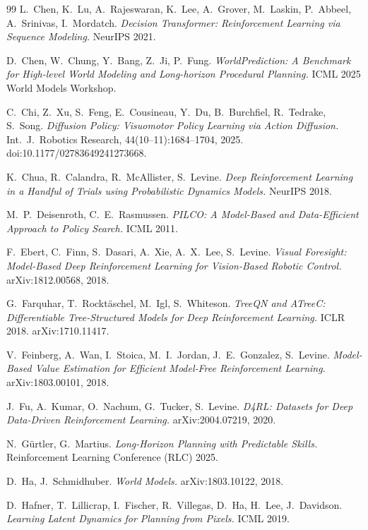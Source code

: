 \documentclass{article}
\begin{document}
\begin{thebibliography}{99}
L.~Chen, K.~Lu, A.~Rajeswaran, K.~Lee, A.~Grover, M.~Laskin, P.~Abbeel, A.~Srinivas, I.~Mordatch.
\emph{Decision Transformer: Reinforcement Learning via Sequence Modeling.}
NeurIPS 2021.

D.~Chen, W.~Chung, Y.~Bang, Z.~Ji, P.~Fung.
\emph{WorldPrediction: A Benchmark for High-level World Modeling and Long-horizon Procedural Planning.}
ICML 2025 World Models Workshop.

C.~Chi, Z.~Xu, S.~Feng, E.~Cousineau, Y.~Du, B.~Burchfiel, R.~Tedrake, S.~Song.
\emph{Diffusion Policy: Visuomotor Policy Learning via Action Diffusion.}
Int.\ J.\ Robotics Research, 44(10--11):1684--1704, 2025. doi:10.1177/02783649241273668.

K.~Chua, R.~Calandra, R.~McAllister, S.~Levine.
\emph{Deep Reinforcement Learning in a Handful of Trials using Probabilistic Dynamics Models.}
NeurIPS 2018.

M.~P.~Deisenroth, C.~E.~Rasmussen.
\emph{PILCO: A Model-Based and Data-Efficient Approach to Policy Search.}
ICML 2011.

F.~Ebert, C.~Finn, S.~Dasari, A.~Xie, A.~X.~Lee, S.~Levine.
\emph{Visual Foresight: Model-Based Deep Reinforcement Learning for Vision-Based Robotic Control.}
arXiv:1812.00568, 2018.

G.~Farquhar, T.~Rockt{\"a}schel, M.~Igl, S.~Whiteson.
\emph{TreeQN and ATreeC: Differentiable Tree-Structured Models for Deep Reinforcement Learning.}
ICLR 2018. arXiv:1710.11417.

V.~Feinberg, A.~Wan, I.~Stoica, M.~I.~Jordan, J.~E.~Gonzalez, S.~Levine.
\emph{Model-Based Value Estimation for Efficient Model-Free Reinforcement Learning.}
arXiv:1803.00101, 2018.

J.~Fu, A.~Kumar, O.~Nachum, G.~Tucker, S.~Levine.
\emph{D4RL: Datasets for Deep Data-Driven Reinforcement Learning.}
arXiv:2004.07219, 2020.

N.~G{\"u}rtler, G.~Martius.
\emph{Long-Horizon Planning with Predictable Skills.}
Reinforcement Learning Conference (RLC) 2025.

D.~Ha, J.~Schmidhuber.
\emph{World Models.}
arXiv:1803.10122, 2018.

D.~Hafner, T.~Lillicrap, I.~Fischer, R.~Villegas, D.~Ha, H.~Lee, J.~Davidson.
\emph{Learning Latent Dynamics for Planning from Pixels.}
ICML 2019.


\end{thebibliography}
\end{document}
